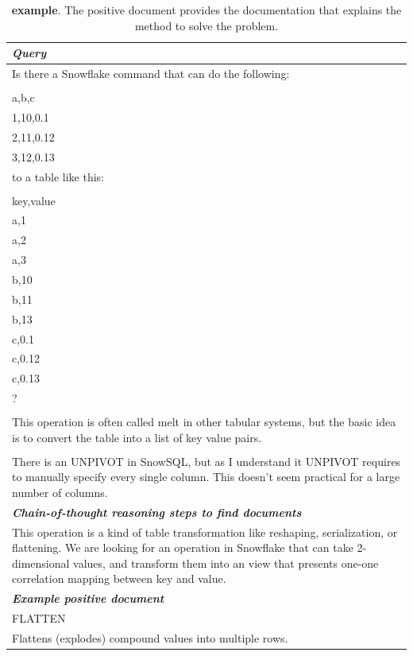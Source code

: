 \begin{table}[ht]
\caption{\textbf{\stackoverflow example}. The positive document provides the documentation that explains the method to solve the problem.}
\centering
\begin{tabular}{p{13cm}}
\toprule
\textit{\textbf{Query}} \\
\midrule
Is there a Snowflake command that can do the following: \\
\\
a,b,c \\
1,10,0.1 \\
2,11,0.12 \\
3,12,0.13 \\
to a table like this: \\
 \\
key,value \\
a,1 \\
a,2 \\
a,3 \\ 
b,10 \\
b,11 \\
b,13 \\
c,0.1 \\
c,0.12 \\
c,0.13 \\
? \\
 \\
This operation is often called melt in other tabular systems, but the basic idea is to convert the table into a list of key value pairs. \\
 \\
There is an UNPIVOT in SnowSQL, but as I understand it UNPIVOT requires to manually specify every single column. This doesn't seem practical for a large number of columns. \\
\midrule
\textit{\textbf{Chain-of-thought reasoning steps to find documents}} \\
\midrule
This operation is a kind of table transformation like reshaping, serialization, or flattening. We are looking for an operation in Snowflake that can take 2-dimensional values, and transform them into an view that presents one-one correlation mapping between key and value. \\
\midrule
\textit{\textbf{Example positive document}} \\
\midrule
FLATTEN \\
Flattens (explodes) compound values into multiple rows. \\

\end{tabular}
\end{table}
